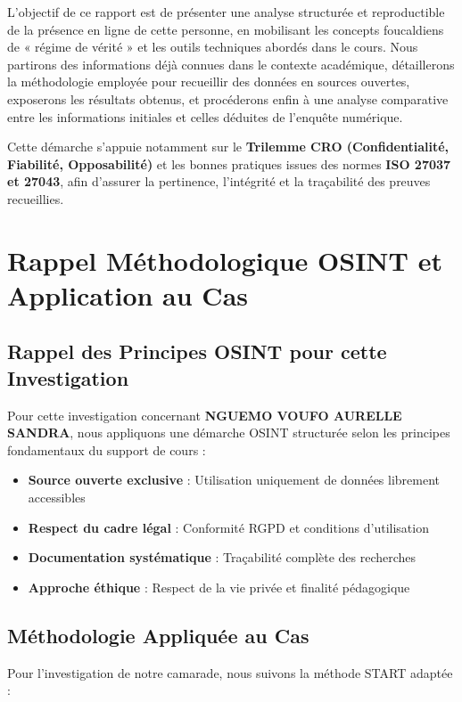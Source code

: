\documentclass[12pt, a4paper]{article}
\begin{document}
L'objectif de ce rapport est de présenter une analyse structurée et reproductible de la présence en ligne de cette personne, en mobilisant les concepts foucaldiens de « régime de vérité » et les outils techniques abordés dans le cours. Nous partirons des informations déjà connues dans le contexte académique, détaillerons la méthodologie employée pour recueillir des données en sources ouvertes, exposerons les résultats obtenus, et procéderons enfin à une analyse comparative entre les informations initiales et celles déduites de l'enquête numérique.

Cette démarche s'appuie notamment sur le \textbf{Trilemme CRO (Confidentialité, Fiabilité, Opposabilité)} et les bonnes pratiques issues des normes \textbf{ISO 27037 et 27043}, afin d'assurer la pertinence, l'intégrité et la traçabilité des preuves recueillies.

\newpage
\section{Rappel Méthodologique OSINT et Application au Cas}

\subsection{Rappel des Principes OSINT pour cette Investigation}

Pour cette investigation concernant \textbf{NGUEMO VOUFO AURELLE SANDRA}, nous appliquons une démarche OSINT structurée selon les principes fondamentaux du support de cours :

\begin{itemize}
    \item \textbf{Source ouverte exclusive} : Utilisation uniquement de données librement accessibles
    \item \textbf{Respect du cadre légal} : Conformité RGPD et conditions d'utilisation
    \item \textbf{Documentation systématique} : Traçabilité complète des recherches
    \item \textbf{Approche éthique} : Respect de la vie privée et finalité pédagogique
\end{itemize}

\subsection{Méthodologie Appliquée au Cas}

Pour l'investigation de notre camarade, nous suivons la méthode START adaptée :
\end{document}
